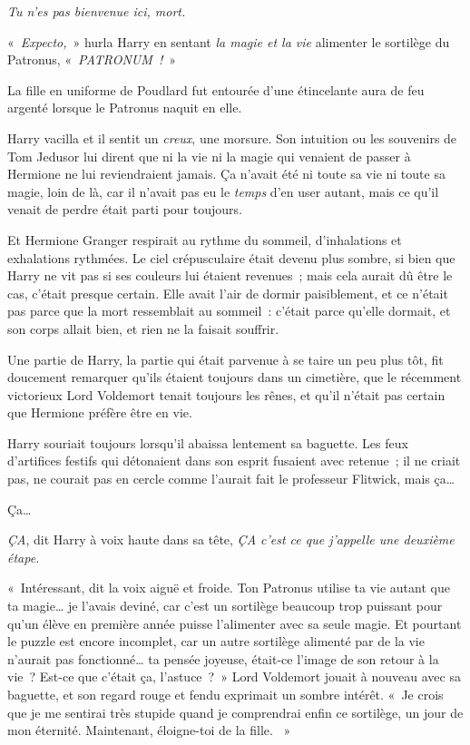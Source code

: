 \emph{Tu n'es pas bienvenue ici, mort.}

«~\emph{Expecto,}~» hurla Harry en sentant \emph{la magie et la vie} alimenter le sortilège du Patronus, «~\emph{PATRONUM~!}~»

La fille en uniforme de Poudlard fut entourée d'une étincelante aura de feu argenté lorsque le Patronus naquit en elle.

Harry vacilla et il sentit un \emph{creux}, une morsure. Son intuition ou les souvenirs de Tom Jedusor lui dirent que ni la vie ni la magie qui venaient de passer à Hermione ne lui reviendraient jamais. Ça n'avait été ni toute sa vie ni toute sa magie, loin de là, car il n'avait pas eu le \emph{temps} d'en user autant, mais ce qu'il venait de perdre était parti pour toujours.

Et Hermione Granger respirait au rythme du sommeil, d'inhalations et exhalations rythmées. Le ciel crépusculaire était devenu plus sombre, si bien que Harry ne vit pas si ses couleurs lui étaient revenues~; mais cela aurait dû être le cas, c'était presque certain. Elle avait l'air de dormir paisiblement, et ce n'était pas parce que la mort ressemblait au sommeil~: c'était parce qu'elle dormait, et son corps allait bien, et rien ne la faisait souffrir.

Une partie de Harry, la partie qui était parvenue à se taire un peu plus tôt, fit doucement remarquer qu'ils étaient toujours dans un cimetière, que le récemment victorieux Lord Voldemort tenait toujours les rênes, et qu'il n'était pas certain que Hermione préfère être en vie.

Harry souriait toujours lorsqu'il abaissa lentement sa baguette. Les feux d'artifices festifs qui détonaient dans son esprit fusaient avec retenue~; il ne criait pas, ne courait pas en cercle comme l'aurait fait le professeur Flitwick, mais ça…

Ça…

\emph{ÇA}, dit Harry à voix haute dans sa tête, \emph{ÇA c'est ce que j'appelle une deuxième étape.}

«~Intéressant, dit la voix aiguë et froide. Ton Patronus utilise ta vie autant que ta magie… je l'avais deviné, car c'est un sortilège beaucoup trop puissant pour qu'un élève en première année puisse l'alimenter avec sa seule magie. Et pourtant le puzzle est encore incomplet, car un autre sortilège alimenté par de la vie n'aurait pas fonctionné… ta pensée joyeuse, était-ce l'image de son retour à la vie~? Est-ce que c'était ça, l'astuce~?~» Lord Voldemort jouait à nouveau avec sa baguette, et son regard rouge et fendu exprimait un sombre intérêt. «~Je crois que je me sentirai très stupide quand je comprendrai enfin ce sortilège, un jour de mon éternité. Maintenant, éloigne-toi de la fille. ~»

